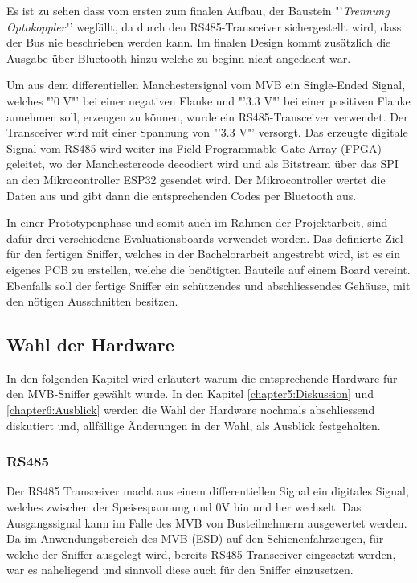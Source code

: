 Es ist zu sehen dass vom ersten zum finalen Aufbau, der Baustein "'\textit{Trennung Optokoppler}"'
wegfällt, da durch den RS485-Transceiver sichergestellt wird, dass der Bus nie beschrieben werden kann.
Im finalen Design kommt zusätzlich die Ausgabe über Bluetooth hinzu welche zu beginn nicht angedacht
war.

Um aus dem differentiellen Manchestersignal vom MVB ein Single-Ended Signal, welches "'0 V"' bei einer 
negativen Flanke und "'3.3 V"' bei einer positiven Flanke annehmen soll, erzeugen zu können, wurde ein
RS485-Transceiver verwendet. Der Transceiver wird mit einer Spannung von "'3.3 V"' versorgt. Das
erzeugte digitale Signal vom RS485 wird weiter ins Field Programmable Gate Array (FPGA) geleitet, wo
der Manchestercode decodiert wird und als Bitstream über das SPI an den Mikrocontroller ESP32 gesendet
wird. Der Mikrocontroller wertet die Daten aus und gibt dann die entsprechenden Codes per Bluetooth aus.

In einer Prototypenphase und somit auch im Rahmen der Projektarbeit, sind dafür drei verschiedene
Evaluationsboards verwendet worden. Das definierte Ziel für den fertigen Sniffer, welches in der
Bachelorarbeit angestrebt wird, ist es ein eigenes PCB zu erstellen, welche die benötigten Bauteile auf
einem Board vereint. Ebenfalls soll der fertige Sniffer ein schützendes und abschliessendes Gehäuse,
mit den nötigen Ausschnitten besitzen.

\subsection{Wahl der Hardware}
In den folgenden Kapitel wird erläutert warum die entsprechende Hardware für den MVB-Sniffer gewählt
wurde. In den Kapitel \ref{chapter5:Diskussion} und \ref{chapter6:Ausblick} werden die Wahl der
Hardware nochmals abschliessend diskutiert und, allfällige Änderungen in der Wahl, als Ausblick 
festgehalten.


\subsubsection{RS485}
Der RS485 Transceiver macht aus einem differentiellen Signal ein digitales Signal, welches zwischen der Speisespannung und 0V hin und her wechselt. Das Ausgangssignal kann im Falle des MVB von Busteilnehmern ausgewertet werden. Da im Anwendungsbereich des MVB (ESD) auf den Schienenfahrzeugen, für welche der Sniffer ausgelegt wird, bereits RS485 Transceiver eingesetzt werden, war es naheliegend und sinnvoll diese auch für den Sniffer einzusetzen.

